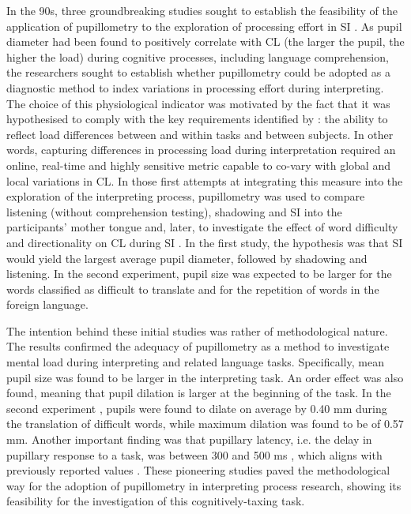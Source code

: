 In the 90s, three groundbreaking studies sought to establish the feasibility of the application of pupillometry to the exploration of processing effort in SI \citep{tommola1986mental,tommola_mental_1990, hyona_pupil_1995}. As pupil diameter had been found to positively correlate with CL (the larger the pupil, the higher the load) during cognitive processes, including language comprehension, the researchers sought to establish whether pupillometry could be adopted as a diagnostic method to index variations in processing effort during interpreting. The choice of this physiological indicator was motivated by the fact that it was hypothesised to comply with the key requirements identified by \citet{kahneman_attention_1973}: the ability to reflect load differences between and within tasks and between subjects. In other words, capturing differences in processing load during interpretation required an online, real-time and highly sensitive metric capable to co-vary with global and local variations in CL. In those first attempts at integrating this measure into the exploration of the interpreting process, pupillometry was used to compare listening (without comprehension testing), shadowing and SI into the participants' mother tongue \citep{tommola_mental_1990} and, later, to investigate the effect of word difficulty and directionality on CL during SI \citep{hyona_pupil_1995}. In the first study, the hypothesis was that SI would yield the largest average pupil diameter, followed by shadowing and listening. In the second experiment, pupil size was expected to be larger for the words classified as difficult to translate and for the repetition of words in the foreign language.

The intention behind these initial studies was rather of methodological nature. The results confirmed the adequacy of pupillometry as a method to investigate mental load during interpreting and related language tasks. Specifically, mean pupil size was found to be larger in the interpreting task. An order effect was also found, meaning that pupil dilation is larger at the beginning of the task. In the second experiment \citep[609]{hyona_pupil_1995}, pupils were found to dilate on average by 0.40 mm during the translation of difficult words, while maximum dilation was found to be of 0.57 mm. Another important finding was that pupillary latency, i.e. the delay in pupillary response to a task, was between 300 and 500 ms \citep[605]{hyona_pupil_1995}, which aligns with previously reported values \citep{beatty_task-evoked_1982,hoeks_pupillary_1993}. These pioneering studies paved the methodological way for the adoption of pupillometry in interpreting process research, showing its feasibility for the investigation of this cognitively-taxing task.

